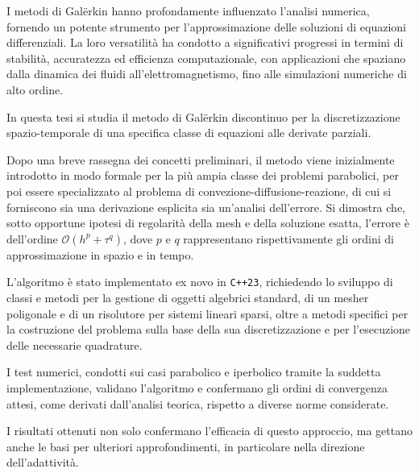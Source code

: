 I metodi di Galërkin hanno profondamente influenzato l'analisi numerica, fornendo un potente strumento per l'approssimazione delle soluzioni di equazioni differenziali. La loro versatilità ha condotto a significativi progressi in termini di stabilità, accuratezza ed efficienza computazionale, con applicazioni che spaziano dalla dinamica dei fluidi all'elettromagnetismo, fino alle simulazioni numeriche di alto ordine.

In questa tesi si studia il metodo di Galërkin discontinuo per la discretizzazione spazio-temporale di una specifica classe di equazioni alle derivate parziali.

Dopo una breve rassegna dei concetti preliminari, il metodo viene inizialmente introdotto in modo formale per la più ampia classe dei problemi parabolici, per poi essere specializzato al problema di convezione-diffusione-reazione, di cui si forniscono sia una derivazione esplicita sia un'analisi dell'errore. Si dimostra che, sotto opportune ipotesi di regolarità della mesh e della soluzione esatta, l'errore è dell'ordine $\mathcal{O}(h^p + \tau^q)$, dove $p$ e $q$ rappresentano rispettivamente gli ordini di approssimazione in spazio e in tempo.

L'algoritmo è stato implementato ex novo in \lstinline{C++23}, richiedendo lo sviluppo di classi e metodi per la gestione di oggetti algebrici standard, di un mesher poligonale e di un risolutore per sistemi lineari sparsi, oltre a metodi specifici per la costruzione del problema sulla base della sua discretizzazione e per l'esecuzione delle necessarie quadrature.

I test numerici, condotti sui casi parabolico e iperbolico tramite la suddetta implementazione, validano l'algoritmo e confermano gli ordini di convergenza attesi, come derivati dall'analisi teorica, rispetto a diverse norme considerate.

I risultati ottenuti non solo confermano l'efficacia di questo approccio, ma gettano anche le basi per ulteriori approfondimenti, in particolare nella direzione dell'adattività.